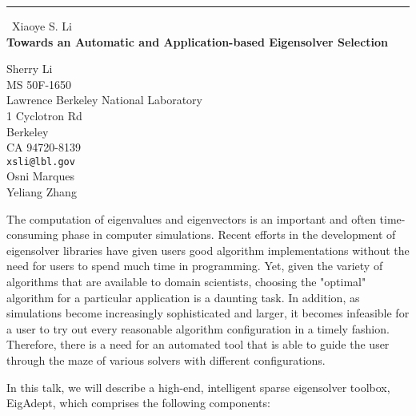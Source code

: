 \documentclass{report}
\begin{document}
\begin{center}
\rule{6in}{1pt} \
{\large Xiaoye S. Li \\
{\bf Towards an Automatic and Application-based Eigensolver Selection}}

Sherry Li \\ MS 50F-1650 \\ Lawrence Berkeley National Laboratory \\ 1 Cyclotron Rd \\ Berkeley \\ CA 94720-8139
\\
{\tt xsli@lbl.gov}\\
Osni Marques\\
Yeliang Zhang\end{center}

The computation of eigenvalues and eigenvectors is an important and often
time-consuming phase in computer simulations. Recent efforts in the
development of eigensolver libraries have given users good algorithm
implementations without the need for users to spend much time in programming.
Yet, given the variety of algorithms that are available to domain scientists,
choosing the "optimal" algorithm for a particular application is a daunting
task. In addition, as simulations become increasingly sophisticated and larger,
it becomes infeasible for a user to try out every reasonable algorithm
configuration in a timely fashion. Therefore, there is a need for an
automated tool that is able to guide the user through the maze of various
solvers with different configurations.

In this talk, we will describe a high-end, intelligent sparse eigensolver
toolbox, EigAdept, which comprises the following components:
\end{document}
